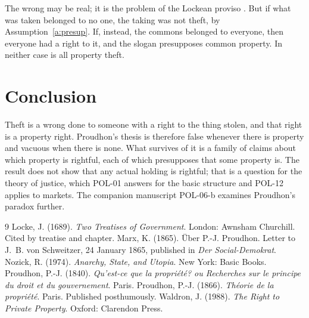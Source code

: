 \documentclass{situationist-preprint}
\begin{document}
\begin{reply}
The wrong may be real; it is the problem of the Lockean proviso \citep{Nozick1974,Waldron1988}. But if what was taken belonged to no one, the taking was not theft, by Assumption~\ref{a:presup}. If, instead, the commons belonged to everyone, then everyone had a right to it, and the slogan presupposes common property. In neither case is all property theft.
\end{reply}

\section{Conclusion}

Theft is a wrong done to someone with a right to the thing stolen, and that right is a property right. Proudhon's thesis is therefore false whenever there is property and vacuous when there is none. What survives of it is a family of claims about which property is rightful, each of which presupposes that some property is. The result does not show that any actual holding is rightful; that is a question for the theory of justice, which POL-01 answers for the basic structure and POL-12 applies to markets. The companion manuscript POL-06-b examines Proudhon's paradox further.

\begin{thebibliography}{9}\small
{} Locke, J. (1689). \emph{Two Treatises of Government}. London: Awnsham Churchill. Cited by treatise and chapter.
 Marx, K. (1865). Über P.-J. Proudhon. Letter to J.~B. von Schweitzer, 24 January 1865, published in \emph{Der Social-Demokrat}.
 Nozick, R. (1974). \emph{Anarchy, State, and Utopia}. New York: Basic Books.
 Proudhon, P.-J. (1840). \emph{Qu'est-ce que la propri\'et\'e? ou Recherches sur le principe du droit et du gouvernement}. Paris.
 Proudhon, P.-J. (1866). \emph{Th\'eorie de la propri\'et\'e}. Paris. Published posthumously.
 Waldron, J. (1988). \emph{The Right to Private Property}. Oxford: Clarendon Press.
\end{thebibliography}
\end{document}
